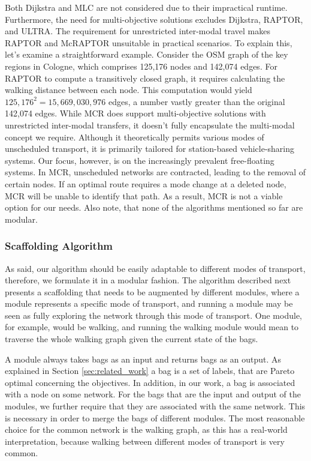 Both Dijkstra and MLC are not considered due to their impractical runtime.
Furthermore, the need for multi-objective solutions excludes Dijkstra, RAPTOR, and ULTRA.
The requirement for unrestricted inter-modal travel makes RAPTOR and McRAPTOR unsuitable in practical scenarios.
To explain this, let's examine a straightforward example.
Consider the OSM graph of the key regions in Cologne, which comprises 125,176 nodes and 142,074 edges.
For RAPTOR to compute a transitively closed graph, it requires calculating the walking distance between each node.
This computation would yield \(125,176^2 = 15,669,030,976\) edges, a number vastly greater than the original 142,074 edges.
While MCR does support multi-objective solutions with unrestricted inter-modal transfers, it doesn't fully encapsulate the multi-modal concept we require.
Although it theoretically permits various modes of unscheduled transport, it is primarily tailored for station-based vehicle-sharing systems.
Our focus, however, is on the increasingly prevalent free-floating systems.
In MCR, unscheduled networks are contracted, leading to the removal of certain nodes.
If an optimal route requires a mode change at a deleted node, MCR will be unable to identify that path.
As a result, MCR is not a viable option for our needs.
Also note, that none of the algorithms mentioned so far are modular.

\subsubsection{Scaffolding Algorithm}
\label{subsubsec:algorithm}

As said, our algorithm should be easily adaptable to different modes of transport, therefore, we formulate it in a modular fashion.
The algorithm described next presents a scaffolding that needs to be augmented by different modules, where a module represents a specific mode of transport, and running a module may be seen as fully exploring the network through this mode of transport.
One module, for example, would be walking, and running the walking module would mean to traverse the whole walking graph given the current state of the bags.

A module always takes bags as an input and returns bags as an output.
As explained in Section \ref{sec:related_work} a bag is a set of labels, that are Pareto optimal concerning the objectives.
In addition, in our work, a bag is associated with a node on some network.
For the bags that are the input and output of the modules, we further require that they are associated with the same network.
This is necessary in order to merge the bags of different modules.
The most reasonable choice for the common network is the walking graph, as this has a real-world interpretation, because walking between different modes of transport is very common.

